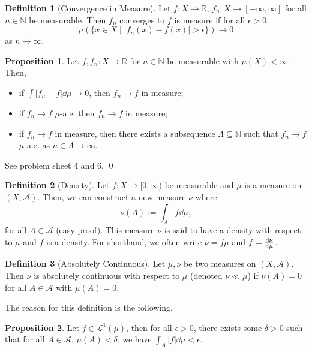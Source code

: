 \documentclass[
]{article}
\theoremstyle{definition}
\newtheorem{prop}{Proposition}
\theoremstyle{definition}
\newtheorem{definition}{Definition}[section]
\begin{document}
\begin{definition}[Convergence in Measure]
  Let \(f : X \to \mathbb{R}\), \(f_n : X \to [-\infty, \infty]\) for all \(n \in \mathbb{N}\)
  be measurable. Then \(f_n\) converges to \(f\) is measure if for all \(\epsilon > 0\), 
  \[\mu(\{x \in X \mid | f_n(x) - f(x) | > \epsilon\}) \to 0\]
  as \(n \to \infty\).
\end{definition}

\begin{prop}
  Let \(f, f_n : X \to \mathbb{R}\) for \(n \in \mathbb{N}\) be measurable with 
  \(\mu(X) < \infty\). Then, 
  \begin{itemize}
    \item if \(\int |f_n - f| \dd \mu \to 0\), then \(f_n \to f\) in measure;
    \item if \(f_n \to f\) \(\mu\)-a.e. then \(f_n \to f\) in measure;
    \item if \(f_n \to f\) in measure, then there exists a subsequence 
    \(\Lambda \subseteq \mathbb{N}\) such that \(f_n \to f\) \(\mu\)-a.e. as 
    \(n \in \Lambda \to \infty\).
  \end{itemize}
\end{prop}
\proof

See problem sheet 4 and 6. \qed

\begin{definition}[Density]
  Let \(f : X \to [0, \infty)\) be measurable and \(\mu\) is a measure on 
  \((X, \mathcal{A})\). Then, we can construct a new measure \(\nu\) where 
  \[\nu(A) := \int_A f \dd \mu,\]
  for all \(A \in \mathcal{A}\) (easy proof). This measure \(\nu\) is said to have a 
  density with respect to \(\mu\) and \(f\) is a density. For shorthand, we often 
  write \(\nu = f \mu\) and \(f = \dv{\nu}{\mu}\).
\end{definition}

\begin{definition}[Absolutely Continuous]
  Let \(\mu, \nu\) be two measures on \((X, \mathcal{A})\). Then \(\nu\) is 
  absolutely continuous with respect to \(\mu\) (denoted \(\nu \ll \mu\)) if 
  \(\nu(A) = 0\) for all \(A \in \mathcal{A}\) with \(\mu(A) = 0\).
\end{definition}

The reason for this definition is the following.

\begin{prop}
  Let \(f \in \mathcal{L}^1(\mu)\), then for all \(\epsilon > 0\), there exists 
  some \(\delta > 0\) such that for all \(A \in \mathcal{A}\), \(\mu(A) < \delta\), 
  we have \(\int_A |f| \dd \mu < \epsilon\).
\end{prop}
\proof
\end{document}
